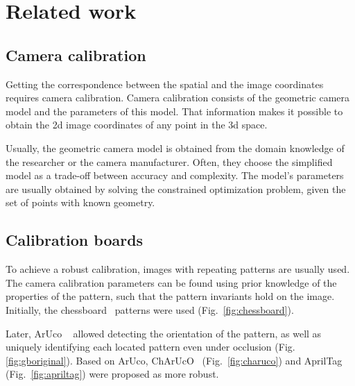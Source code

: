\chapter{Related work}\label{cha:related_work}

\section{Camera calibration}\label{sub:camera_calibration}

Getting the correspondence between the spatial
and the image coordinates requires camera calibration. Camera
calibration consists of the geometric camera model and the parameters of this
model. That information makes it possible to obtain the 2d image coordinates
of any point in the 3d space.

Usually, the geometric camera model is obtained from the domain knowledge of the
researcher or the camera manufacturer. Often, they choose the simplified model as
a trade-off between accuracy and complexity. The model's parameters are usually
obtained by solving the constrained optimization problem, given the set of
points with known geometry.

\section{Calibration boards}\label{sub:calibration_boards}

To achieve a robust calibration, images with repeating patterns are
usually used. The camera
calibration parameters can be found using prior knowledge of the properties of the pattern, such that the pattern invariants hold on
the image. Initially, the chessboard~\citep{OpenCVCameraCalibration, v.douskosAutomaticCalibrationDigital2007} patterns were used
(Fig.~\ref{fig:chessboard}).


Later, ArUco
~\cite{garrido-juradoAutomaticGenerationDetection2014} allowed detecting the
orientation of the pattern, as well as uniquely identifying each located pattern
even under occlusion (Fig. \ref{fig:gboriginal}). Based on ArUco,
ChArUcO~\cite{OpenCVCameraCalibration} (Fig.~\ref{fig:charuco}) and
AprilTag~\cite{olsonAprilTagRobustFlexible2011a} (Fig.~\ref{fig:apriltag}) were
proposed as more robust.

